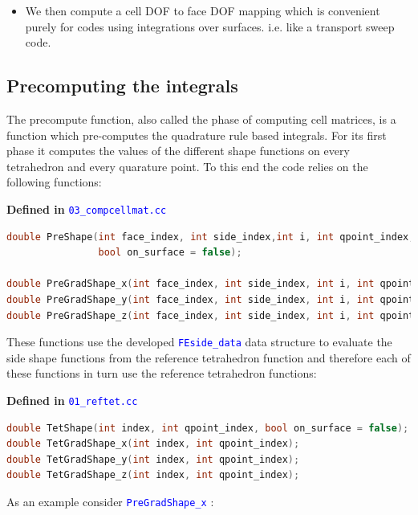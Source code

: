 \documentclass[11pt,letterpaper,titlepage]{article}
\newcommand{\xmltag}[1]{\textcolor{blue}{ \texttt{#1}} }
\begin{document}
\begin{itemize}
\item We then compute a cell DOF to face DOF mapping which is convenient purely for codes using integrations over surfaces. i.e. like a transport sweep code.
 
\end{itemize}


\subsection{Precomputing the integrals}

The precompute function, also called the phase of computing cell matrices, is a function which pre-computes the quadrature rule based integrals. For its first phase it computes the values of the different shape functions on every tetrahedron and every quarature point. To this end the code relies on the following functions:

\vspace{0.5cm}
\textbf{Defined in } \xmltag{03\_compcellmat.cc}
\begin{lstlisting}[language=c++]
double PreShape(int face_index, int side_index,int i, int qpoint_index, 
                bool on_surface = false);

double PreGradShape_x(int face_index, int side_index, int i, int qpoint_index);
double PreGradShape_y(int face_index, int side_index, int i, int qpoint_index);
double PreGradShape_z(int face_index, int side_index, int i, int qpoint_index);
\end{lstlisting}

These functions use the developed \xmltag{FEside\_data} data structure to evaluate the side shape functions from the reference tetrahedron function and therefore each of these functions in turn use the reference tetrahedron functions:

\vspace{0.5cm}
\textbf{Defined in } \xmltag{01\_reftet.cc}
\begin{lstlisting}[language=c++]
double TetShape(int index, int qpoint_index, bool on_surface = false);
double TetGradShape_x(int index, int qpoint_index);
double TetGradShape_y(int index, int qpoint_index);
double TetGradShape_z(int index, int qpoint_index);
\end{lstlisting}

As an example consider \xmltag{PreGradShape\_x}:
\end{document}
